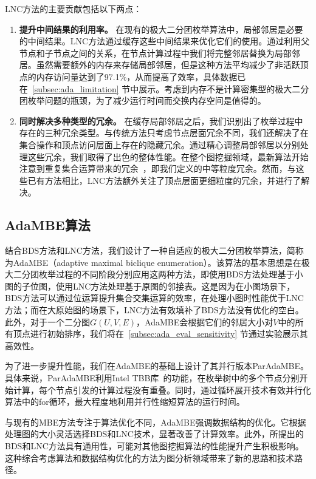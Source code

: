 LNC方法的主要贡献包括以下两点：

\begin{enumerate}
  \item \textbf{提升中间结果的利用率。} 在现有的极大二分团枚举算法中，局部邻居是必要的中间结果。LNC方法通过缓存这些中间结果来优化它们的使用。通过利用父节点和子节点之间的关系，在节点计算过程中我们将完整邻居替换为局部邻居。虽然需要额外的内存来存储局部邻居，但是这种方法平均减少了非活跃顶点的内存访问量达到了97.1\%，从而提高了效率，具体数据已在~\ref{subsec:ada_limitation} 节中展示。考虑到内存不是计算密集型的极大二分团枚举问题的瓶颈，为了减少运行时间而交换内存空间是值得的。

\item \textbf{同时解决多种类型的冗余。} 在缓存局部邻居之后，我们识别出了枚举过程中存在的三种冗余类型。与传统方法只考虑节点层面冗余不同，我们还解决了在集合操作和顶点访问层面上存在的隐藏冗余。通过精心调整局部邻居以分别处理这些冗余，我们取得了出色的整体性能。在整个图挖掘领域，最新算法开始注意到重复集合运算带来的冗余~\cite{Graphpi20,GPMredundancy23}，即我们定义的中等粒度冗余。然而，与这些已有方法相比，LNC方法额外关注了顶点层面更细粒度的冗余，并进行了解决。

\end{enumerate}

\subsection{AdaMBE算法}

结合BDS方法和LNC方法，我们设计了一种自适应的极大二分团枚举算法，简称为AdaMBE（adaptive maximal biclique  enumeration）。该算法的基本思想是在极大二分团枚举过程的不同阶段分别应用这两种方法，即使用BDS方法处理基于小图的子位图，使用LNC方法处理基于原图的邻接表。这是因为在小图场景下，BDS方法可以通过位运算提升集合交集运算的效率，在处理小图时性能优于LNC方法；而在大原始图的场景下，LNC方法有效填补了BDS方法没有优化的空白。此外，对于一个二分图$G(U,V,E)$，AdaMBE会根据它们的邻居大小对$V$中的所有顶点进行初始排序，我们将在~\ref{subsec:ada_eval_sensitivity} 节通过实验展示其高效性。


为了进一步提升性能，我们在AdaMBE的基础上设计了其并行版本ParAdaMBE。具体来说，ParAdaMBE利用Intel TBB库~\cite{tbb-code}的功能，在枚举树中的多个节点分别开始计算，每个节点引发的计算过程没有重叠。同时，通过循环展开技术有效并行化算法中的for循环，最大程度地利用并行性缩短算法的运行时间。%

与现有的MBE方法专注于算法优化不同，AdaMBE强调数据结构的优化。它根据处理图的大小灵活选择BDS和LNC技术，显著改善了计算效率。此外，所提出的BDS和LNC方法具有通用性，可能对其他图挖掘算法的性能提升产生积极影响。这种综合考虑算法和数据结构优化的方法为图分析领域带来了新的思路和技术路径。


